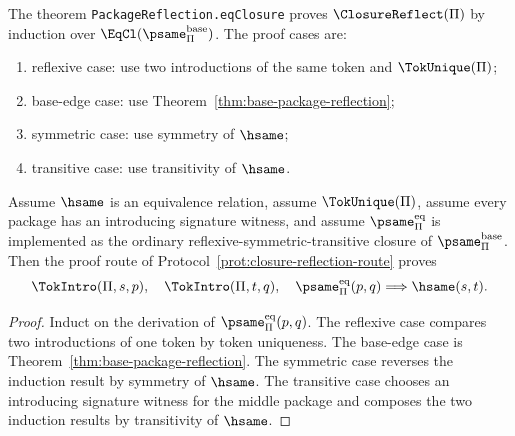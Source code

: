 \begin{protocol}
\label{prot:closure-reflection-route}
The theorem \texttt{PackageReflection.eqClosure} proves \(\ClosureReflect(\Pi)\) by induction over \(\EqCl(\psame_{\Pi}^{\mathrm{base}})\). The proof cases are:
\begin{enumerate}
  \item reflexive case: use two introductions of the same token and \(\TokUnique(\Pi)\);
  \item base-edge case: use Theorem~\ref{thm:base-package-reflection};
  \item symmetric case: use symmetry of \(\hsame\);
  \item transitive case: use transitivity of \(\hsame\).
\end{enumerate}
\end{protocol}

\begin{proposition}
\label{prop:conditional-closure-reflection-schema}
Assume \(\hsame\) is an equivalence relation, assume \(\TokUnique(\Pi)\), assume every package has an introducing signature witness, and assume \(\psame_{\Pi}^{\mathrm{eq}}\) is implemented as the ordinary reflexive-symmetric-transitive closure of \(\psame_{\Pi}^{\mathrm{base}}\). Then the proof route of Protocol~\ref{prot:closure-reflection-route} proves
$$
\TokIntro(\Pi,s,p),\quad \TokIntro(\Pi,t,q),\quad \psame_{\Pi}^{\mathrm{eq}}(p,q)\Longrightarrow \hsame(s,t).
$$
\end{proposition}

\begin{proof}
Induct on the derivation of \(\psame_{\Pi}^{\mathrm{eq}}(p,q)\). The reflexive case compares two introductions of one token by token uniqueness. The base-edge case is Theorem~\ref{thm:base-package-reflection}. The symmetric case reverses the induction result by symmetry of \(\hsame\). The transitive case chooses an introducing signature witness for the middle package and composes the two induction results by transitivity of \(\hsame\).
\end{proof}

